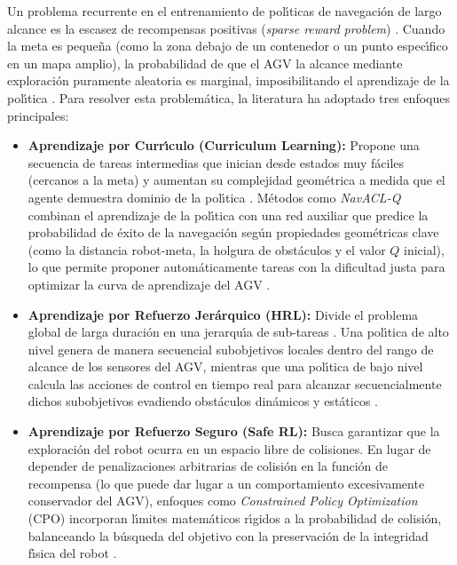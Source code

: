 Un problema recurrente en el entrenamiento de pol\'{\i}ticas de navegaci\'{o}n de largo alcance es la escasez de recompensas positivas (\textit{sparse reward problem}) \cite{Xue2022}. Cuando la meta es peque\~{n}a (como la zona debajo de un contenedor o un punto espec\'{\i}fico en un mapa amplio), la probabilidad de que el AGV la alcance mediante exploraci\'{o}n puramente aleatoria es marginal, imposibilitando el aprendizaje de la pol\'{\i}tica \cite{Xue2022}. Para resolver esta problem\'{a}tica, la literatura ha adoptado tres enfoques principales:

\begin{itemize}
    \item \textbf{Aprendizaje por Curr\'{\i}culo (Curriculum Learning):} Propone una secuencia de tareas intermedias que inician desde estados muy f\'{a}ciles (cercanos a la meta) y aumentan su complejidad geom\'{e}trica a medida que el agente demuestra dominio de la pol\'{\i}tica \cite{Xue2022}. M\'{e}todos como \textit{NavACL-Q} combinan el aprendizaje de la pol\'{\i}tica con una red auxiliar que predice la probabilidad de \'{e}xito de la navegaci\'{o}n seg\'{u}n propiedades geom\'{e}tricas clave (como la distancia robot-meta, la holgura de obst\'{a}culos y el valor $Q$ inicial), lo que permite proponer autom\'{a}ticamente tareas con la dificultad justa para optimizar la curva de aprendizaje del AGV \cite{Xue2022}.
    \item \textbf{Aprendizaje por Refuerzo Jer\'{a}rquico (HRL):} Divide el problema global de larga duraci\'{o}n en una jerarqu\'{\i}a de sub-tareas \cite{Shakya2023}. Una pol\'{\i}tica de alto nivel genera de manera secuencial subobjetivos locales dentro del rango de alcance de los sensores del AGV, mientras que una pol\'{\i}tica de bajo nivel calcula las acciones de control en tiempo real para alcanzar secuencialmente dichos subobjetivos evadiendo obst\'{a}culos din\'{a}micos y est\'{a}ticos \cite{Gao2025}.
    \item \textbf{Aprendizaje por Refuerzo Seguro (Safe RL):} Busca garantizar que la exploraci\'{o}n del robot ocurra en un espacio libre de colisiones. En lugar de depender de penalizaciones arbitrarias de colisi\'{o}n en la funci\'{o}n de recompensa (lo que puede dar lugar a un comportamiento excesivamente conservador del AGV), enfoques como \textit{Constrained Policy Optimization} (CPO) incorporan l\'{\i}mites matem\'{a}ticos r\'{\i}gidos a la probabilidad de colisi\'{o}n, balanceando la b\'{u}squeda del objetivo con la preservaci\'{o}n de la integridad f\'{\i}sica del robot \cite{Gao2025}.
\end{itemize}



